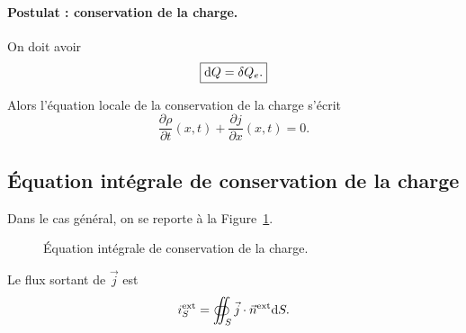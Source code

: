         \paragraph{Postulat : conservation de la charge.}

            On doit avoir 
            \begin{equation*}
                \boxed{
                    \mathrm{d} Q=\delta Q_e.
                }
            \end{equation*}

            Alors l'équation locale de la conservation de la charge s'écrit
            \begin{equation*}
                \boxed{
                    \frac{\partial\rho}{\partial t}(x,t)+\frac{\partial j}{\partial x}(x,t)=0.
                }
            \end{equation*}

    \subsection{Équation intégrale de conservation de la charge}

        Dans le cas général, on se reporte à la Figure~\ref{fig:equation_integrale_conservation_charge}.

        \begin{figure}
            \centering
            \caption{Équation intégrale de conservation de la charge.}    
            \label{fig:equation_integrale_conservation_charge}
        \end{figure}

        Le flux sortant de $\vec{j}$ est 
        \begin{equation*}
            i_S^{\text{ext}}=\oiint_{S}\vec{j}\cdot\vec{n}^{\text{ext}}\mathrm{d} S.
        \end{equation*}

